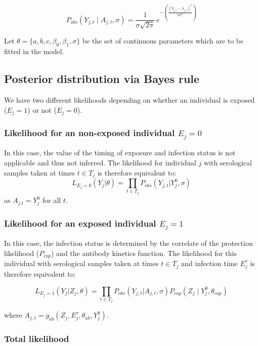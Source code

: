 \begin{equation}
\label{eq:ll_obs}
P_{obs}(Y_{j,t} \mid A_{j,t}, \sigma) = \frac{1}{\sigma \sqrt{2\pi}} \, e^{-\left(\frac{(Y_{j,t} - A_{j,t})^2}{2\sigma^2}\right)}
\end{equation}

Let $\theta = \{a, b, c, \beta_0, \beta_1, \sigma\}$ be the set of continuous parameters which are to be fitted in the model. 

\subsection{Posterior distribution via Bayes rule}

We have two different likelihoods depending on whether an individual is exposed ($E_j = 1$) or not ($E_j = 0$).

\subsubsection{Likelihood for an non-exposed individual $E_j = 0$} 
In this case, the value of the timing of exposure and infection status is not applicable and thus not inferred. The likelihood for individual $j$ with serological samples taken at times $t\in T_j$ is therefore equivalent to:
\begin{equation}
\label{ll:1E0}
L_{E_j = 0}(Y_{j}| \theta) = \prod_{t \in T_j}P_{obs}(Y_{j,t}|Y^0_{j}, \sigma)
\end{equation}
as $A_{j.t} = Y^0_{j}$ for all $t$.


\subsubsection{Likelihood for an exposed individual $E_j = 1$}
In this case, the infection status is determined by the correlate of the protection likelihood ($P_{cop}$) and the antibody kinetics function. The likelihood for this individual with serological samples taken at times $t\in T_j$ and infection time $E^\tau_j$ is therefore equivalent to:

\begin{equation}
\label{ll:1E1}
L_{E_j = 1}(Y_{j}| Z_j, \theta) = \prod_{t \in T_j}P_{obs}(Y_{j,t}| A_{j,t}, \sigma)P_{cop}(Z_j \mid Y_{j}^0, \theta_{cop})
\end{equation}

where $A_{j,t} = g_{ab}( Z_j,  E_j^\tau, \theta_{ab}, Y^0_j)$.


\subsubsection{Total likelihood}

